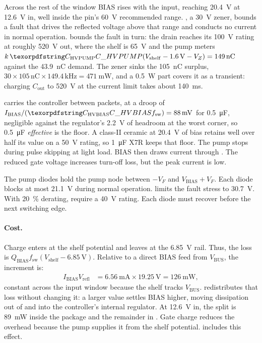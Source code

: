 Across the rest of the window BIAS rises with the input, reaching
\SI{20.4}{\volt} at \SI{12.6}{\volt} in, well inside the pin's \SI{60}{\volt}
recommended range. , a \SI{30}{\volt} zener, bounds a fault that
drives the reflected voltage above that range and conducts no current in normal
operation.  bounds the fault in turn: the drain reaches its
\SI{100}{\volt} rating at roughly \SI{520}{\volt} out, where the shelf is
\SI{65}{\volt} and the pump meters $k\,\des{C}{HVPUMP}(V_{\mathrm{shelf}} -
\SI{1.6}{\volt} - V_Z) = \SI{149}{\nano\coulomb}$ against the
\SI{43.9}{\nano\coulomb} demand. The zener sinks the \SI{105}{\nano\coulomb}
surplus, $30 \times 105\,\si{\nano\coulomb} \times 149.4\,\si{\kilo\hertz} =
\SI{471}{\milli\watt}$, and a \SI{0.5}{\watt} part covers it as a transient:
charging $C_{\mathrm{out}}$ to \SI{520}{\volt} at the current limit takes about
\SI{140}{\milli\second}.

 carries the controller between packets, at a droop of
$I_{\mathrm{BIAS}}/(\des{C}{HVBIAS} f_{\mathrm{sw}}) = \SI{88}{\milli\volt}$ for
\SI{0.5}{\micro\farad}, negligible against the regulator's \SI{2.2}{\volt} of
headroom at the worst corner, so \SI{0.5}{\micro\farad} \emph{effective} is the
floor. A class-II ceramic at \SI{20.4}{\volt} of bias retains well over half its
value on a \SI{50}{\volt} rating, so \SI{1}{\micro\farad} X7R keeps that floor.
The pump stops during pulse skipping at light load. BIAS then draws current
through . The reduced gate voltage increases turn-off loss, but
the peak current is low.

The pump diodes hold the pump node between $-V_F$ and
$V_{\mathrm{BIAS}}+V_F$. Each diode blocks at most \SI{21.1}{\volt} during
normal operation.  limits the fault stress to
\SI{30.7}{\volt}. With \SI{20}{\percent} derating, require a
\SI{40}{\volt} rating. Each diode must recover before the next switching edge.

\paragraph{Cost.} Charge enters at the shelf potential and leaves at the
\SI{6.85}{\volt} rail. Thus, the loss is
$Q_{\mathrm{BIAS}}f_{\mathrm{sw}}(V_{\mathrm{shelf}}-\SI{6.85}{\volt})$.
Relative to a direct BIAS feed from $V_{\mathrm{BUS}}$, the increment is:
\begin{align*}
  I_{\mathrm{BIAS}} V_{\mathrm{refl}}
  &= \SI{6.56}{\milli\ampere} \times \SI{19.25}{\volt}
  = \SI{126}{\milli\watt},
\end{align*}
constant across the input window because the shelf tracks $V_{\mathrm{BUS}}$.
 redistributes that loss without changing it: a larger value
settles BIAS higher, moving dissipation out of  and into the
controller's internal regulator. At \SI{12.6}{\volt} in, the split is
\SI{89}{\milli\watt} inside the package and the remainder in .
Gate charge reduces the overhead because the pump supplies it from the shelf
potential.  includes this effect.

